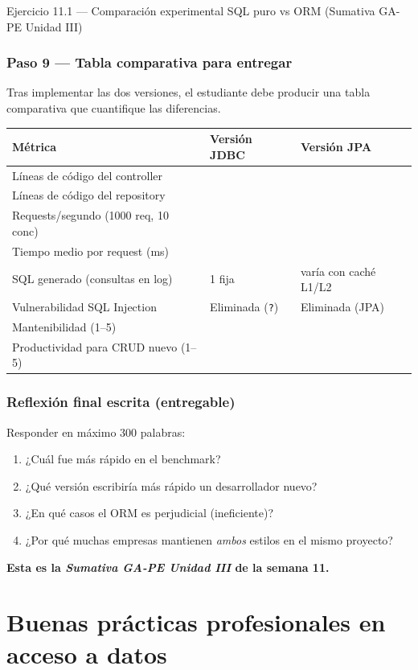 \begin{cajaejercicio}{Ejercicio 11.1 --- Comparación experimental SQL puro vs ORM (Sumativa GA-PE Unidad III)}
\subsubsection*{Paso 9 --- Tabla comparativa para entregar}

Tras implementar las dos versiones, el estudiante debe
producir una tabla comparativa que cuantifique las diferencias.


\begin{tabularx}{\textwidth}{Xll}
\toprule
\textbf{Métrica} & \textbf{Versión JDBC} & \textbf{Versión JPA}\\
\midrule
Líneas de código del controller & & \\
Líneas de código del repository & & \\
Requests/segundo (1000 req, 10 conc) & & \\
Tiempo medio por request (ms) & & \\
SQL generado (consultas en log) & 1 fija & varía con caché L1/L2 \\
Vulnerabilidad SQL Injection & Eliminada (\texttt{?}) & Eliminada (JPA) \\
Mantenibilidad (1--5) & & \\
Productividad para CRUD nuevo (1--5) & & \\
\bottomrule
\end{tabularx}

\subsubsection*{Reflexión final escrita (entregable)}

Responder en máximo 300 palabras:
\begin{enumerate}
\item ¿Cuál fue más rápido en el benchmark?
\item ¿Qué versión escribiría más rápido un desarrollador nuevo?
\item ¿En qué casos el ORM es perjudicial (ineficiente)?
\item ¿Por qué muchas empresas mantienen \emph{ambos} estilos en el
mismo proyecto?
\end{enumerate}

\textbf{Esta es la \emph{Sumativa GA-PE Unidad III} de la semana 11.}
\end{cajaejercicio}

\section{Buenas prácticas profesionales en acceso a datos}

